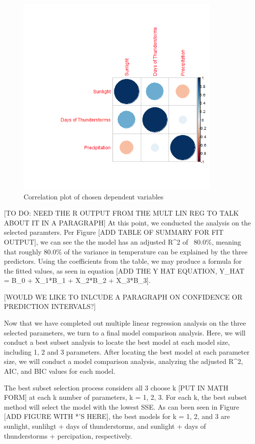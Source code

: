 \begin{figure}
  \centering
  \includegraphics[width=10cm]{../data/img/correlation_plot.PNG}
  \caption{Correlation plot of chosen dependent variables}
  \label{fig:correlation_plot}
\end{figure}

[TO DO: NEED THE R OUTPUT FROM THE MULT LIN REG TO TALK ABOUT IT IN A PARAGRAPH] At this point, we conducted the analysis on the selected paramters. Per Figure [ADD TABLE OF SUMMARY FOR FIT OUTPUT], we can see the the model has an adjusted R^2 of ~80.0\%, meaning that roughly 80.0\% of the variance in temperature can be explained by the three predictors. Using the coefficients from the table, we may produce a formula for the fitted values, as seen in equation [ADD THE Y HAT EQUATION, Y_HAT = B_0 + X_1*B_1 + X_2*B_2 + X_3*B_3].

[WOULD WE LIKE TO INLCUDE A PARAGRAPH ON CONFIDENCE OR PREDICTION INTERVALS?]

Now that we have completed out multiple linear regression analysis on the three selected parameters, we turn to a final model comparison analysis. Here, we will conduct a best subset analysis to locate the best model at each model size, including 1, 2 and 3 parameters. After locating the best model at each parameter size, we will conduct a model comparison analysis, analyzing the adjusted R^2, AIC, and BIC values for each model.

The best subset selection process considers all 3 choose k [PUT IN MATH FORM] at each k number of parameters, k = 1, 2, 3. For each k, the best subset method will select the model with the lowest SSE. As can been seen in Figure [ADD FIGURE WITH *'S HERE], the best models for k = 1, 2, and 3 are sunlight, sunlihgt + days of thunderstorms, and sunlight + days of thunderstorms + percipation, respectively.

